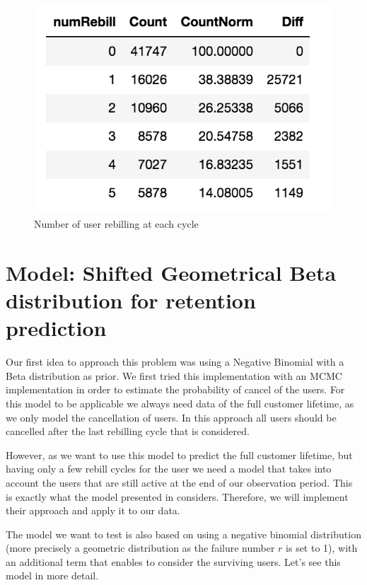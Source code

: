\documentclass[paper=a4, fontsize=11pt]{scrartcl} %
\numberwithin{equation}{section} %
\numberwithin{figure}{section} %
\numberwithin{table}{section} %
\begin{document}
	\begin{figure}[h!]
		\centering
		\includegraphics[scale = 0.55]{Data_sample.png}
		\caption{Number of user rebilling at each cycle}
		\label{fig:Data_sample}
	\end{figure}
	
	\section{Model: Shifted Geometrical Beta distribution for retention prediction}
	
	Our first idea to approach this problem was using a Negative Binomial with a Beta distribution as prior. We first tried this implementation with an MCMC implementation in order to estimate the probability of cancel of the users. For this model to be applicable we always need data of the full customer lifetime, as we only model the cancellation of users. In this approach all users should be cancelled after the last rebilling cycle that is considered.
	
	However, as we want to use this model to predict the full customer lifetime, but having only a few rebill cycles for the user we need a model that takes into account the users that are still active at the end of our observation period. This is exactly what the model presented in \cite{feder07} considers. Therefore, we will implement their approach and apply it to our data.
	
	The model we want to test is also based on using a negative binomial distribution (more precisely a geometric distribution as the failure number $r$ is set to 1), with an additional term that enables to consider the surviving users. Let's see this model in more detail. 
	
\end{document}
